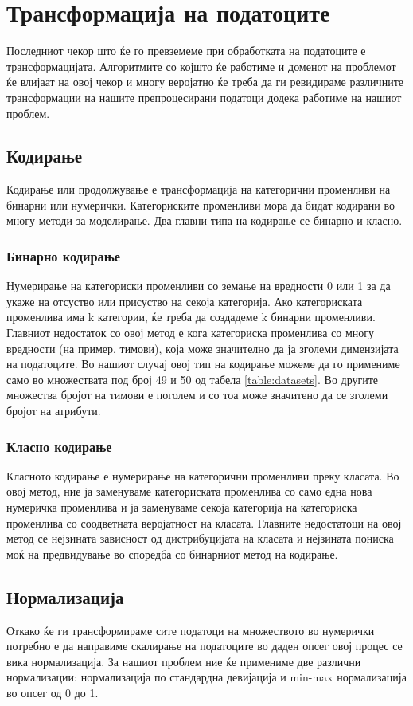 \section{Трансформација на податоците}
Последниот чекор што ќе го превземеме при обработката на податоците е трансформацијата. Алгоритмите со којшто ќе работиме и доменот на проблемот ќе влијаат на овој чекор и многу веројатно ќе треба да ги ревидираме различните трансформации на нашите препроцесирани податоци додека работиме на нашиот проблем.
\subsection{Кодирање}
Кодирање или продолжување е трансформација на категорични променливи на бинарни или нумерички. Категориските променливи мора да бидат кодирани во многу методи за моделирање. Два главни типа на кодирање се бинарно и класно.

\subsubsection{Бинарно кодирање}
Нумерирање на категориски променливи со земање на вредности 0 или 1 за да укаже на отсуство или присуство на секоја категорија. Ако категориската променлива има k категории, ќе треба да создадеме k бинарни променливи. Главниот недостаток со овој метод е кога категориска променлива со многу вредности (на пример, тимови), која може значително да ја зголеми димензијата на податоците. Во нашиот случај овој тип на кодирање можеме да го примениме само во множествата под број 49 и 50 од табела \ref{table:datasets}. Во другите множества бројот на тимови е поголем и со тоа може значитено да се зголеми бројот на атрибути.
\subsubsection{Класно кодирање}
Класното кодирање е нумерирање на категорични променливи преку класата. Во овој метод, ние ја заменуваме категориската променлива со само една нова нумеричка променлива и ја заменуваме секоја категорија на категориска променлива со соодветната веројатност на класата. Главните недостатоци на овој метод се нејзината зависност од дистрибуцијата на класата и нејзината пониска моќ на предвидување во споредба со бинарниот метод на кодирање.
\subsection{Нормализација}
Откако ќе ги трансформираме сите податоци на множеството во нумерички потребно е да направиме скалирање на податоците во даден опсег овој процес се вика нормализација. За нашиот проблем ние ќе примениме две различни нормализации: нормализација по стандардна девијација и min-max нормализација во опсег од 0 до 1. 
